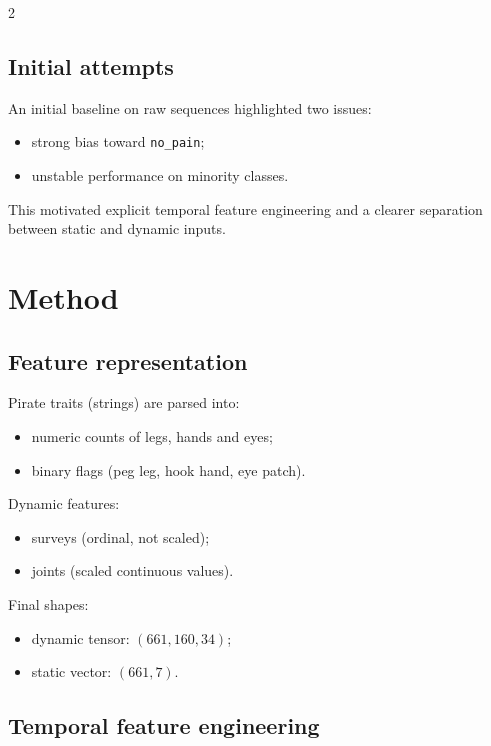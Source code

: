 \documentclass[11pt]{article}
\begin{document}
\begin{multicols}{2}
        \subsection*{Initial attempts}

        An initial baseline on raw sequences highlighted two issues:
        \begin{itemize}[nosep]
            \item strong bias toward \texttt{no\_pain};
            \item unstable performance on minority classes.
        \end{itemize}
        This motivated explicit temporal feature engineering and a clearer separation between static and dynamic inputs.

        \vspace{-.8em}

        \section{Method}

        \vspace{-.2em}
        \subsection*{Feature representation}
        
        Pirate traits (strings) are parsed into:
        \begin{itemize}[nosep]
            \item numeric counts of legs, hands and eyes;
            \item binary flags (peg leg, hook hand, eye patch).
        \end{itemize}
        Dynamic features:
        \begin{itemize}[nosep]
            \item surveys (ordinal, not scaled);
            \item joints (scaled continuous values).
        \end{itemize}
        Final shapes:
        \begin{itemize}[nosep]
            \item dynamic tensor: \((661,160,34)\);
            \item static vector: \((661,7)\).
        \end{itemize}

        \subsection*{Temporal feature engineering}


\end{multicols}
\end{document}

